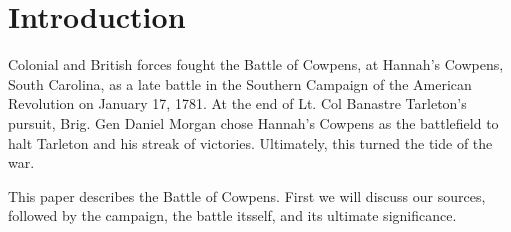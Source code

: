 \section{Introduction}



Colonial and British forces fought the Battle of Cowpens, at Hannah's Cowpens,
South Carolina, as a late battle in the Southern Campaign of the American
Revolution on January 17, 1781. At the end of Lt. Col Banastre Tarleton's
pursuit, Brig. Gen Daniel Morgan chose Hannah's Cowpens as the
battlefield to halt Tarleton and his streak of victories. Ultimately, this
turned the tide of the war.

This paper describes the Battle of Cowpens. First we will discuss our sources, followed
by the campaign, the battle itsself, and its ultimate significance.








